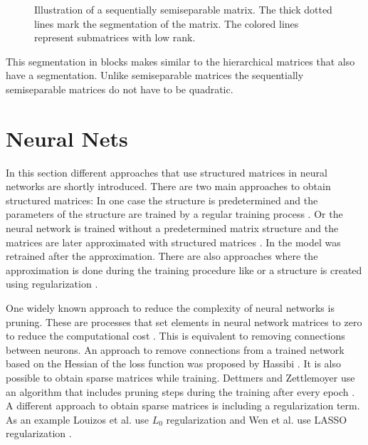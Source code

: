 \documentclass[doctype=mastersthesis,BCOR=15mm,biblatex]{ldvbook}%
\begin{document}
\begin{figure}[htb]
	\centering
	
	\caption{Illustration of a sequentially semiseparable matrix. The thick dotted lines mark the segmentation of the matrix. The colored lines represent submatrices with low rank.}
	\label{fig:sequentiallysep}
\end{figure}

This segmentation in blocks makes similar to the hierarchical matrices that also have a segmentation.
Unlike semiseparable matrices the sequentially semiseparable matrices do not have to be quadratic. 

\section{Neural Nets}\label{sec:AI_weight}
In this section different approaches that use structured matrices in neural networks are shortly introduced.
There are two main approaches to obtain structured matrices:
In one case the structure is predetermined and the parameters of the structure are trained by a regular training process \cite{fan_multiscale_2019,dao_kaleidoscope_2020,li_butterfly_2015,ailon_sparse_2021,ioannou_training_2016}.
Or the neural network is trained without a predetermined matrix structure and the matrices are later approximated with structured matrices \cite{wu_hybrid_2020,hassibi_optimal_1993,jaderberg_speeding_2014,rigamonti_learning_2013}. In \cite{yu_compressing_2017} the model was retrained after the approximation. 
There are also approaches where the approximation is done during the training procedure like \cite{dettmers_sparse_2019} or a structure is created using regularization \cite{louizos_learning_2018,wen_learning_2016}.


One widely known approach to reduce the complexity of neural networks is pruning. 
These are processes that set elements in neural network matrices to zero to reduce the computational cost \cite{blalock_what_2020}.
This is equivalent to removing connections between neurons.
An approach to remove connections from a trained network based on the Hessian of the loss function was proposed by Hassibi \cite{hassibi_optimal_1993}.
It is also possible to obtain sparse matrices while training.
Dettmers and Zettlemoyer use an algorithm that includes pruning steps during the training after every epoch \cite{dettmers_sparse_2019}.
A different approach to obtain sparse matrices is including a regularization term.
As an example Louizos et al. use $L_0$ regularization  \cite{louizos_learning_2018} and Wen et al. use LASSO regularization \cite{wen_learning_2016}.
\end{document}
